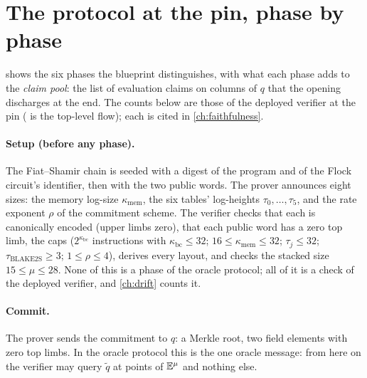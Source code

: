 \section{The protocol at the pin, phase by phase}\label{sec:map-protocol}

 shows the six phases the blueprint distinguishes, with what each phase adds
to the \emph{claim pool}: the list of evaluation claims on columns of $q$ that the opening
discharges at the end. The counts below are those of the deployed verifier at the pin
( is the top-level flow); each is cited in
\cref{ch:faithfulness}.

\paragraph{Setup (before any phase).} The Fiat--Shamir chain is seeded with a digest of the
program and of the Flock circuit's identifier, then with the two public words. The prover
announces eight sizes: the memory log-size $\kappa_{\mathrm{mem}}$, the six tables' log-heights
$\tau_0, \dots, \tau_5$, and the rate exponent $\rho$ of the commitment scheme. The verifier
checks that each is canonically encoded (upper limbs zero), that each public word has a zero
top limb, the caps ($2^{\kappa_{\mathrm{bc}}}$ instructions with $\kappa_{\mathrm{bc}} \le 32$;
$16 \le \kappa_{\mathrm{mem}} \le 32$; $\tau_j \le 32$; $\tau_{\mathrm{BLAKE2S}} \ge 3$;
$1 \le \rho \le 4$), derives every layout, and checks the stacked size
$15 \le \mu \le 28$. None of this is a phase of the oracle protocol; all of it is a check of
the deployed verifier, and \cref{ch:drift} counts it.

\paragraph{Commit.} The prover sends the commitment to $q$: a Merkle root, two field elements
with zero top limbs. In the oracle protocol this is the one oracle message: from here on the
verifier may query $\widetilde{q}$ at points of $\mathbb{E}^{\mu}$ and nothing else.

